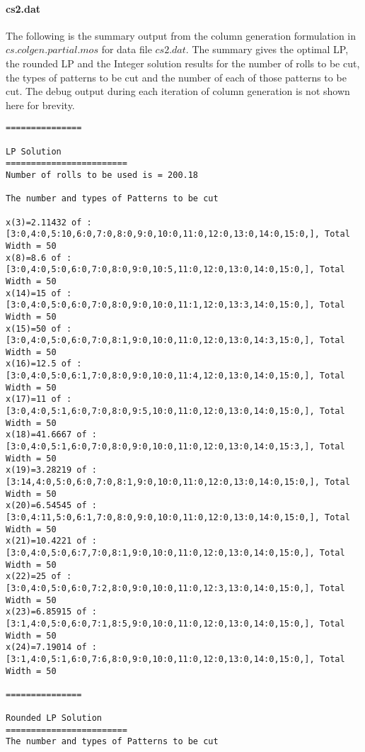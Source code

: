 \documentclass[twoside,12pt]{article}
\begin{document}
\paragraph{cs2.dat}
The following is the summary output from the column generation formulation in $ cs.colgen.partial.mos$ for data file $cs2.dat$. The summary gives the optimal LP, the rounded LP and the Integer solution results for the number of rolls to be cut, the types of patterns to be cut and the number of each of those patterns to be cut. The debug output during each iteration of column generation is not shown here for brevity.

\begin{verbatim}
===============

LP Solution
========================
Number of rolls to be used is = 200.18

The number and types of Patterns to be cut

x(3)=2.11432 of : [3:0,4:0,5:10,6:0,7:0,8:0,9:0,10:0,11:0,12:0,13:0,14:0,15:0,], Total Width = 50
x(8)=8.6 of : [3:0,4:0,5:0,6:0,7:0,8:0,9:0,10:5,11:0,12:0,13:0,14:0,15:0,], Total Width = 50
x(14)=15 of : [3:0,4:0,5:0,6:0,7:0,8:0,9:0,10:0,11:1,12:0,13:3,14:0,15:0,], Total Width = 50
x(15)=50 of : [3:0,4:0,5:0,6:0,7:0,8:1,9:0,10:0,11:0,12:0,13:0,14:3,15:0,], Total Width = 50
x(16)=12.5 of : [3:0,4:0,5:0,6:1,7:0,8:0,9:0,10:0,11:4,12:0,13:0,14:0,15:0,], Total Width = 50
x(17)=11 of : [3:0,4:0,5:1,6:0,7:0,8:0,9:5,10:0,11:0,12:0,13:0,14:0,15:0,], Total Width = 50
x(18)=41.6667 of : [3:0,4:0,5:1,6:0,7:0,8:0,9:0,10:0,11:0,12:0,13:0,14:0,15:3,], Total Width = 50
x(19)=3.28219 of : [3:14,4:0,5:0,6:0,7:0,8:1,9:0,10:0,11:0,12:0,13:0,14:0,15:0,], Total Width = 50
x(20)=6.54545 of : [3:0,4:11,5:0,6:1,7:0,8:0,9:0,10:0,11:0,12:0,13:0,14:0,15:0,], Total Width = 50
x(21)=10.4221 of : [3:0,4:0,5:0,6:7,7:0,8:1,9:0,10:0,11:0,12:0,13:0,14:0,15:0,], Total Width = 50
x(22)=25 of : [3:0,4:0,5:0,6:0,7:2,8:0,9:0,10:0,11:0,12:3,13:0,14:0,15:0,], Total Width = 50
x(23)=6.85915 of : [3:1,4:0,5:0,6:0,7:1,8:5,9:0,10:0,11:0,12:0,13:0,14:0,15:0,], Total Width = 50
x(24)=7.19014 of : [3:1,4:0,5:1,6:0,7:6,8:0,9:0,10:0,11:0,12:0,13:0,14:0,15:0,], Total Width = 50

===============

Rounded LP Solution
========================
The number and types of Patterns to be cut


\end{verbatim}
\end{document}

